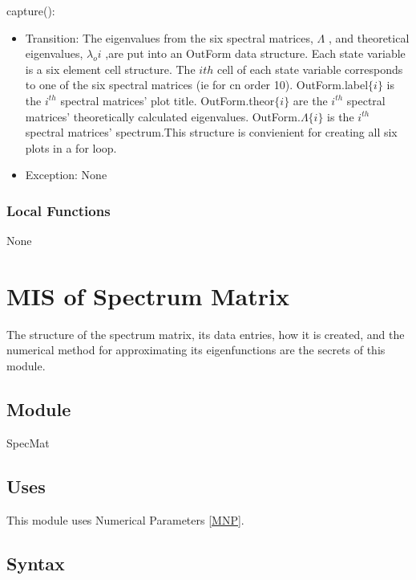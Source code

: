 \documentclass[12pt, titlepage]{article}
\begin{document}
\noindent capture():
\begin{itemize}
	\item Transition: The eigenvalues from the six spectral matrices, $\Lambda$ 
	,
	and theoretical eigenvalues, $\lambda_{o}i$ ,are put into an OutForm data 
	structure. Each state variable is a six element cell structure. The $ith$ 
	cell of each state variable corresponds to one of the six spectral 
	matrices (ie for cn order 10). OutForm.label$\{i\}$ is the 
	$i^{th}$ 
	spectral matrices' plot title. OutForm.theor$\{i\}$ are the $i^{th}$ 
	spectral 
	matrices' theoretically calculated eigenvalues. OutForm.$\Lambda$$\{i\}$ is 
	the 
	$i^{th}$ spectral matrices' spectrum.This structure is convienient for 
	creating all six plots in a 
	for loop. 
	\item Exception: None
\end{itemize}  

\subsubsection{Local Functions}

None

\newpage
\section{MIS of Spectrum Matrix} \label{SSM}

The structure of the spectrum matrix, its data entries, how 
it is created, and the numerical method for approximating its 
eigenfunctions are the secrets of this module.  

\subsection{Module}

SpecMat

\subsection{Uses}

This module uses Numerical Parameters \ref{MNP}. 

\subsection{Syntax}
\end{document}
